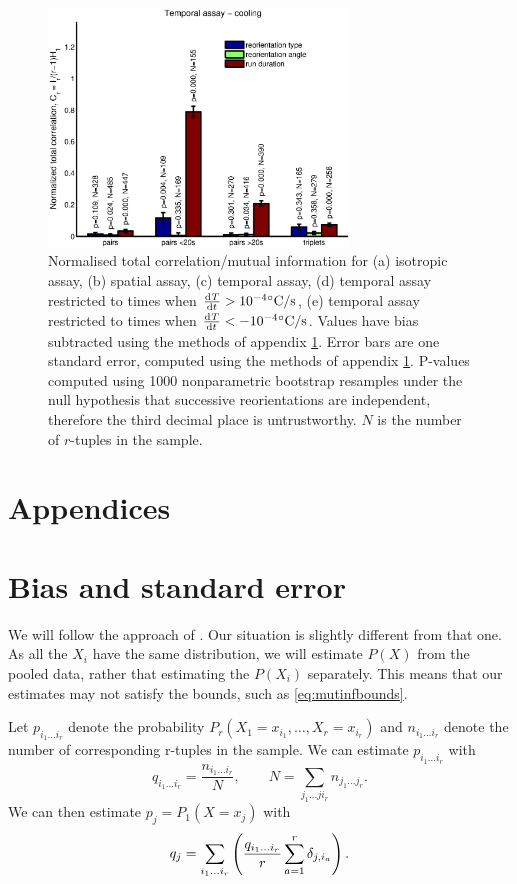 \documentclass[12pt]{article}
\begin{document}
\begin{figure}
\begin{center}
    \includegraphics[width=8cm]{cooling.eps}
  \end{center}
  \caption{Normalised total correlation/mutual information for (a) isotropic assay, (b) spatial assay, (c) temporal assay, (d) temporal assay restricted to times when $\diff{T}{t} > 10^{-4}\mbox{}\dC/\mathrm{s}$, (e) temporal assay restricted to times when $\diff{T}{t} < -10^{-4}\mbox{}\dC/\mathrm{s}$. Values have bias subtracted using the methods of appendix \ref{sec:stderr}. Error bars are one standard error, computed using the methods of appendix \ref{sec:stderr}. P-values computed using 1000 nonparametric bootstrap resamples under the null hypothesis that successive reorientations are independent, therefore the third decimal place is untrustworthy. $N$ is the number of $r$-tuples in the sample.} \label{fig:results}
\end{figure}


\appendix\section*{Appendices}

\section{Bias and standard error}\label{sec:stderr}

We will follow the approach of \cite{1999PhyD..125..285R}. Our situation is slightly different from that one. As all the $X_i$ have the same distribution, we will estimate $P(X)$ from the pooled data, rather that estimating the $P(X_i)$ separately. This means that our estimates may not satisfy the bounds, such as \eqref{eq:mutinfbounds}.

Let $p_{i_1\ldots i_r}$ denote the probability $P_r(X_1=x_{i_1},\ldots,X_r=x_{i_r})$ and $n_{i_1\ldots i_r}$ denote the number of corresponding r-tuples in the sample. We can estimate $p_{i_1\ldots i_r}$ with
%
\begin{equation}\label{eq:tupprob}
  q_{i_1\ldots i_r} = \frac{n_{i_1\ldots i_r}}{N},
  \qquad
  N = \sum_{j_1\ldots ji_r} n_{j_1\ldots j_r}.
\end{equation}
%
We can then estimate $p_{j}=P_1(X=x_{j})$ with
%
\begin{equation}\label{eq:singprob}
  q_j = \sum_{i_1\ldots i_r}\left (  \frac{q_{i_1\ldots i_r}}{r} \sum_{a=1}^r \delta_{j,i_a} \right ).
\end{equation}
%
\end{document}
